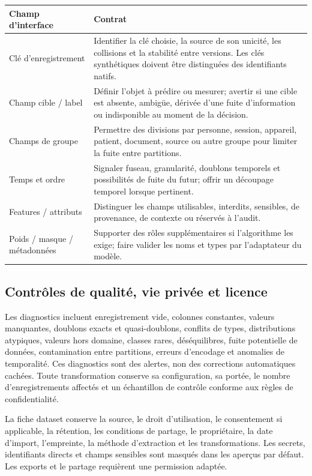 \documentclass[11pt,a4paper]{article}
\begin{document}
\begin{longtable}{p{}p{}}
\toprule
\textbf{Champ d'interface} & \textbf{Contrat}\\
\midrule
Clé d'enregistrement & Identifier la clé choisie, la source de son unicité, les collisions et la stabilité entre versions. Les clés synthétiques doivent être distinguées des identifiants natifs.\\
Champ cible / label & Définir l'objet à prédire ou mesurer; avertir si une cible est absente, ambigüe, dérivée d'une fuite d'information ou indisponible au moment de la décision.\\
Champs de groupe & Permettre des divisions par personne, session, appareil, patient, document, source ou autre groupe pour limiter la fuite entre partitions.\\
Temps et ordre & Signaler fuseau, granularité, doublons temporels et possibilités de fuite du futur; offrir un découpage temporel lorsque pertinent.\\
Features / attributs & Distinguer les champs utilisables, interdits, sensibles, de provenance, de contexte ou réservés à l'audit.\\
Poids / masque / métadonnées & Supporter des rôles supplémentaires si l'algorithme les exige; faire valider les noms et types par l'adaptateur du modèle.\\
\bottomrule
\end{longtable}

\subsection{Contrôles de qualité, vie privée et licence}
Les diagnostics incluent enregistrement vide, colonnes constantes, valeurs manquantes, doublons exacts et quasi-doublons, conflits de types, distributions atypiques, valeurs hors domaine, classes rares, déséquilibres, fuite potentielle de données, contamination entre partitions, erreurs d'encodage et anomalies de temporalité. Ces diagnostics sont des alertes, non des corrections automatiques cachées. Toute transformation conserve sa configuration, sa portée, le nombre d'enregistrements affectés et un échantillon de contrôle conforme aux règles de confidentialité.

La fiche dataset conserve la source, le droit d'utilisation, le consentement si applicable, la rétention, les conditions de partage, le propriétaire, la date d'import, l'empreinte, la méthode d'extraction et les transformations. Les secrets, identifiants directs et champs sensibles sont masqués dans les aperçus par défaut. Les exports et le partage requièrent une permission adaptée.
\end{document}
